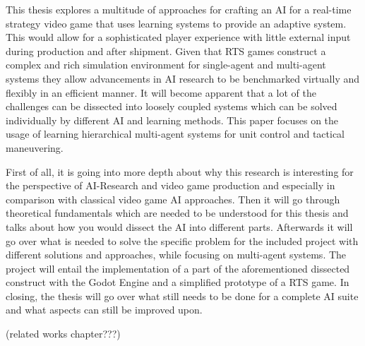 
\Abstract
This thesis explores a multitude of approaches for crafting an AI for a real-time strategy video game that uses learning systems to provide an adaptive system. This would allow for a sophisticated player experience with little external input during production and after shipment. Given that RTS games construct a complex and rich simulation environment for single-agent and multi-agent systems they allow advancements in AI research to be benchmarked virtually and flexibly in an efficient manner. It will become apparent that a lot of the challenges can be dissected into loosely coupled systems which can be solved individually by different AI and learning methods. This paper focuses on the usage of learning hierarchical multi-agent systems for unit control and tactical maneuvering.
\bigskip

First of all, it is going into more depth about why this research is interesting for the perspective of AI-Research and video game production and especially in comparison with classical video game AI approaches. Then it will go through theoretical fundamentals which are needed to be understood for this thesis and talks about how you would dissect the AI into different parts. Afterwards it will go over what is needed to solve the specific problem for the included project with different solutions and approaches, while focusing on multi-agent systems. The project will entail the implementation of a part of the aforementioned dissected construct with the Godot Engine and a simplified prototype of a RTS game. In closing, the thesis will go over what still needs to be done for a complete AI suite and what aspects can still be improved upon.

(related works chapter???)